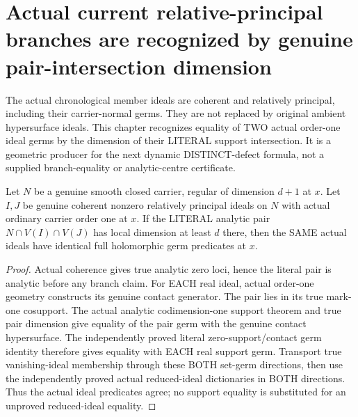 \section{Actual current relative-principal branches are recognized by genuine pair-intersection dimension}

The actual chronological member ideals are coherent and relatively principal,
including their carrier-normal germs. They are not replaced by original
ambient hypersurface ideals. This chapter recognizes equality of TWO actual
order-one ideal germs by the dimension of their LITERAL support intersection.
It is a geometric producer for the next dynamic DISTINCT-defect formula,
not a supplied branch-equality or analytic-centre certificate.

\begin{theorem}
\label{hir:sharp-actual-relative-principal-germ-eq-of-pair-dimension}
\leanok
Let $N$ be a genuine smooth closed carrier, regular of dimension $d+1$ at
$x$. Let $I,J$ be genuine coherent nonzero relatively principal ideals on $N$
with actual ordinary carrier order one at $x$. If the LITERAL analytic pair
$N\cap V(I)\cap V(J)$ has local dimension at least $d$ there, then the SAME
actual ideals have identical full holomorphic germ predicates at $x$.
\end{theorem}
\begin{proof}
Actual coherence gives true analytic zero loci, hence the literal pair is
analytic before any branch claim. For EACH real ideal, actual order-one
geometry constructs its genuine contact generator. The pair lies in its
true mark-one cosupport. The actual analytic codimension-one support theorem
and true pair dimension give equality of the pair germ with the genuine
contact hypersurface. The independently proved literal zero-support/contact
germ identity therefore gives equality with EACH real support germ.
Transport true vanishing-ideal membership through these BOTH set-germ
directions, then use the independently proved actual reduced-ideal
dictionaries in BOTH directions. Thus the actual ideal predicates agree;
no support equality is substituted for an unproved reduced-ideal equality.
\end{proof}

